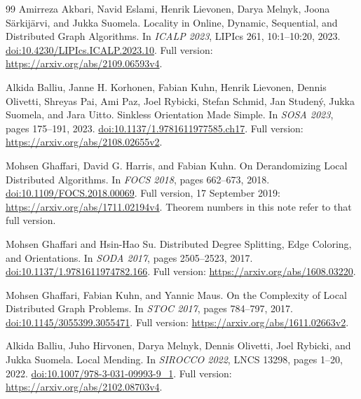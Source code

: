 \documentclass[11pt]{article}
\theoremstyle{definition}
\begin{document}
\begin{thebibliography}{99}
Amirreza Akbari, Navid Eslami, Henrik Lievonen, Darya Melnyk,
Joona S\"arkij\"arvi, and Jukka Suomela.
\newblock Locality in Online, Dynamic, Sequential, and Distributed Graph Algorithms.
\newblock In \emph{ICALP 2023}, LIPIcs 261, 10:1--10:20, 2023.
\newblock \href{https://doi.org/10.4230/LIPIcs.ICALP.2023.10}{doi:10.4230/LIPIcs.ICALP.2023.10}.
\newblock Full version: \url{https://arxiv.org/abs/2109.06593v4}.

Alkida Balliu, Janne H. Korhonen, Fabian Kuhn, Henrik Lievonen,
Dennis Olivetti, Shreyas Pai, Ami Paz, Joel Rybicki, Stefan Schmid,
Jan Studen\'y, Jukka Suomela, and Jara Uitto.
\newblock Sinkless Orientation Made Simple.
\newblock In \emph{SOSA 2023}, pages 175--191, 2023.
\newblock \href{https://doi.org/10.1137/1.9781611977585.ch17}{doi:10.1137/1.9781611977585.ch17}.
\newblock Full version: \url{https://arxiv.org/abs/2108.02655v2}.

Mohsen Ghaffari, David G. Harris, and Fabian Kuhn.
\newblock On Derandomizing Local Distributed Algorithms.
\newblock In \emph{FOCS 2018}, pages 662--673, 2018.
\newblock \href{https://doi.org/10.1109/FOCS.2018.00069}{doi:10.1109/FOCS.2018.00069}.
\newblock Full version, 17 September 2019:
\url{https://arxiv.org/abs/1711.02194v4}.
\newblock Theorem numbers in this note refer to that full version.

Mohsen Ghaffari and Hsin-Hao Su.
\newblock Distributed Degree Splitting, Edge Coloring, and Orientations.
\newblock In \emph{SODA 2017}, pages 2505--2523, 2017.
\newblock \href{https://doi.org/10.1137/1.9781611974782.166}{doi:10.1137/1.9781611974782.166}.
\newblock Full version: \url{https://arxiv.org/abs/1608.03220}.

Mohsen Ghaffari, Fabian Kuhn, and Yannic Maus.
\newblock On the Complexity of Local Distributed Graph Problems.
\newblock In \emph{STOC 2017}, pages 784--797, 2017.
\newblock \href{https://doi.org/10.1145/3055399.3055471}{doi:10.1145/3055399.3055471}.
\newblock Full version: \url{https://arxiv.org/abs/1611.02663v2}.

Alkida Balliu, Juho Hirvonen, Darya Melnyk, Dennis Olivetti,
Joel Rybicki, and Jukka Suomela.
\newblock Local Mending.
\newblock In \emph{SIROCCO 2022}, LNCS 13298, pages 1--20, 2022.
\newblock \href{https://doi.org/10.1007/978-3-031-09993-9_1}{doi:10.1007/978-3-031-09993-9\_1}.
\newblock Full version: \url{https://arxiv.org/abs/2102.08703v4}.


\end{thebibliography}
\end{document}
